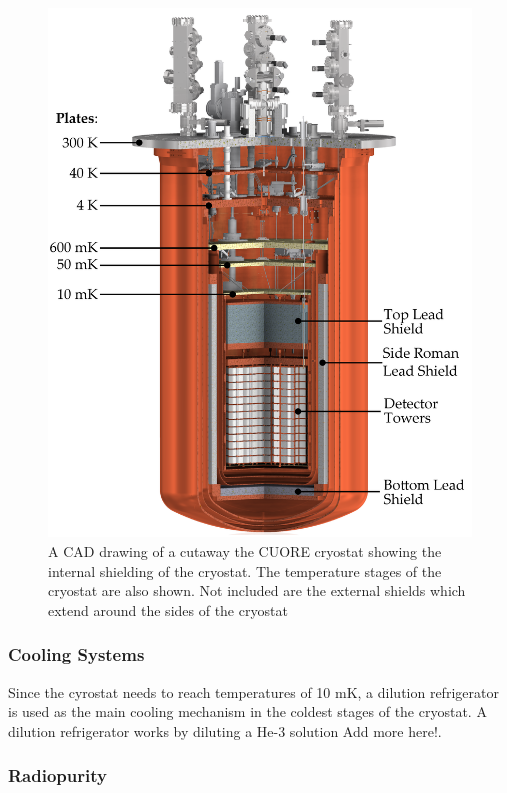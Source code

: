 \begin{figure}[htbp]
\centering
\includegraphics[width=\linewidth]{Figures/cryostat_Adjusted.png}
\caption{A CAD drawing of a cutaway the CUORE cryostat showing the internal shielding of the cryostat. The temperature stages of the cryostat are also shown. Not included are the external shields which extend around the sides of the cryostat}
\label{fig:cryostat_cad_cutout}
\end{figure}

\subsubsection*{Cooling Systems}

Since the cyrostat needs to reach temperatures of 10 mK, a dilution refrigerator is used as the main cooling mechanism in the coldest stages of the cryostat. A dilution refrigerator works by diluting a He-3 solution \color{red}Add more here!\color{black}.

\subsubsection*{Radiopurity}

